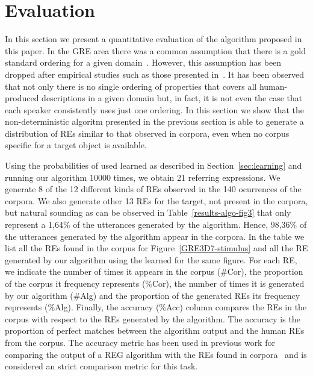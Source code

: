 \section{Evaluation}
\label{sec:evaluation}

In this section we present a quantitative evaluation of the algorithm proposed in this paper. In the GRE area there was a common assumption that there is a gold standard ordering for a given domain~\cite{Dale1995}. However, this assumption has been dropped after empirical studies such as those presented in~\cite{arec2:2008:Areces,viet:gene11}. It has been observed that not only there is no single ordering of properties that covers all human-produced descriptions in a given domain but, in fact, it is not even the case that each speaker consistently uses just one ordering. In this section we show that the non-deterministic algoritm presented in the previous section is able to generate a distribution of REs similar to that observed in corpora, even when no corpus specific for a target object is available. 

Using the probabilities of used learned as described in Section~\ref{sec:learning} and running our algorithm 10000 times, we obtain 21 referring expressions. We generate 8 of the 12 different kinds of REs observed in the 140 ocurrences of the corpora. We also generate other 13 REs for the target, not present in the corpora, but natural sounding as can be observed in Table~\ref{results-algo-fig3} that only represent a 1,64\% of the utterances generated by the algorithm. Hence, 98,36\% of the utterances generated by the algorithm appear in the corpora. In the table we list all the REs found in the corpus for Figure~\ref{GRE3D7-stimulus} and all the RE generated by our algorithm using the learned \puse for the same figure. For each RE, we indicate the number of times it appears in the corpus (\#Cor), the proportion of the corpus it frequency represents (\%Cor), the number of times it is generated by our algorithm (\#Alg) and the proportion of the generated REs its frequency represents (\%Alg). Finally, the accuracy (\%Acc) column compares the REs in the corpus with respect to the REs generated by the algorithm. The accuracy is the proportion of perfect matches between the algorithm output and the human REs from the corpus. The accuracy metric has been used in previous work for comparing the output of a REG algorithm with the REs found in corpora~\cite{sluis07:eval,viet:gene11} and is considered an strict comparison metric for this task. 

